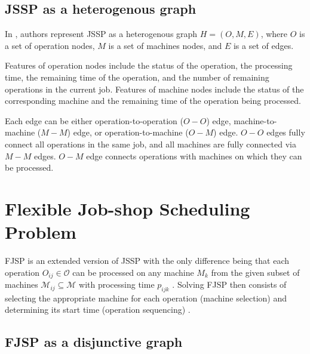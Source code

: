 \subsection{JSSP as a heterogenous graph}

In \cite{10226873}, authors represent JSSP as a heterogenous graph $H = (O, M, E)$, where $O$ is a set of operation nodes, $M$ is a set of machines nodes, and $E$ is a set of edges.
\par
Features of operation nodes include the status of the operation, the processing time, the remaining time of the operation, and the number of remaining operations in the current job. Features of machine nodes include the status of the corresponding machine and the remaining time of the operation being processed.
\par
Each edge can be either operation-to-operation ($O-O$) edge, machine-to-machine ($M-M$) edge, or operation-to-machine ($O-M$) edge. $O-O$ edges fully connect all operations in the same job, and all machines are fully connected via $M-M$ edges. $O-M$ edge connects operations with machines on which they can be processed.

\section{Flexible Job-shop Scheduling Problem}

FJSP is an extended version of JSSP with the only difference being that each operation $O_{ij} \in \mathcal{O}$ can be processed on any machine $M_k$ from the given subset of machines $\mathcal{M}_{ij} \subseteq \mathcal{M}$ with processing time $p_{ijk}$ \cite{9826438}. Solving FJSP then consists of selecting the appropriate machine for each operation (machine selection) and determining its start time (operation sequencing) \cite{https://doi.org/10.1049/iet-cim.2018.0009}. 

\subsection{FJSP as a disjunctive graph}

